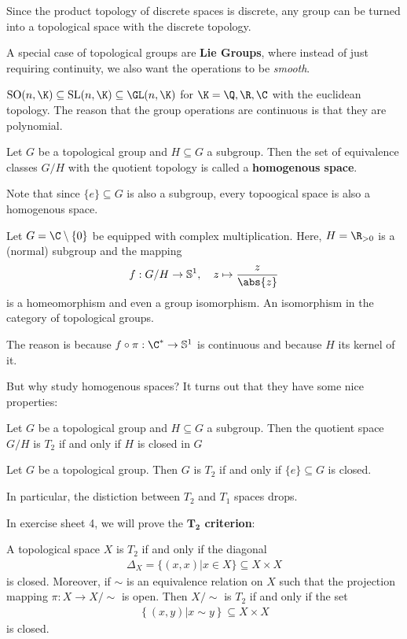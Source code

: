 \begin{ex}[]
Since the product topology of discrete spaces is discrete, any group can be turned into a topological space with the discrete topology.

A special case of topological groups are \textbf{Lie Groups}, where instead of just requiring continuity, we also want the operations to be \emph{smooth}.

$\text{SO}(n,\K) \subseteq \text{SL}(n,\K) \subseteq \GL(n,\K)$ for $\K = \Q,\R,\C$ with the euclidean topology.
The reason that the group operations are continuous is that they are polynomial.
\end{ex}

\begin{dfn}[]
  Let $G$ be a topological group and $H \subseteq G$ a subgroup. 
  Then the set of equivalence classes $G/H$ with the quotient topology is called a \textbf{homogenous space}.
\end{dfn}
Note that since $\{e\} \subseteq G$ is also a subgroup, every topoogical space is also a homogenous space.

\begin{ex}[]
  Let $G = \C \setminus \{0\}$ be equipped with complex multiplication. Here, $H = \R_{>0}$ is a (normal) subgroup and the mapping
  \begin{align*}
    f: G/H \to \mathbb{S}^{1}, \quad z \mapsto \frac{z}{\abs{z}}
  \end{align*}
  is a homeomorphism and even a group isomorphism. An isomorphism in the category of topological groups.

  The reason is because $f \circ \pi: \C^{\ast} \to \mathbb{S}^{1}$ is continuous and because $H$ its kernel of it.
\end{ex}

But why study homogenous spaces?
It turns out that they have some nice properties:
\begin{lem}[]
Let $G$ be a topological group and $H \subseteq G$ a subgroup.
Then the quotient space $G/H$ is $T_2$ if and only if $H$ is closed in $G$
\end{lem}
\begin{cor}[]
Let $G$ be a topological group. Then $G$ is $T_2$ if and only if $\{e\} \subseteq G$ is closed.
\end{cor}
In particular, the distiction between $T_2$ and $T_1$ spaces drops.


In exercise sheet 4, we will prove the \textbf{$\bm{T_2}$ criterion}:
\begin{prop}[$T_2$ criterion]
  A topological space $X$ is $T_2$ if and only if the diagonal
  \begin{align*}
    \Delta_X = \{(x,x) \big\vert x \in X\} \subseteq X \times X
  \end{align*}
  is closed. 
  Moreover, if $\sim$ is an equivalence relation on $X$ such that the projection mapping $\pi: X \to X/\sim$ is open. 
  Then $X/\sim$ is $T_2$ if and only if the set
  \begin{align*}
    \left\{(x,y) \big\vert x \sim y\right\} \subseteq X \times X
  \end{align*}
  is closed.
\end{prop}

